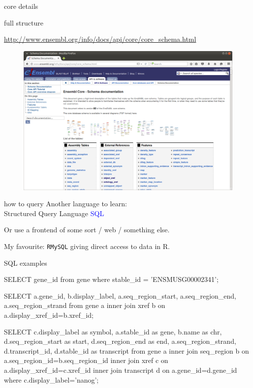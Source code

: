 \documentclass[pdf]{beamer}
\begin{document}
\begin{frame}{core details}
\begin{figure}[ht]
  \end{figure}
\end{frame}

\begin{frame}{full structure}
  
  \tiny \url{http://www.ensembl.org/info/docs/api/core/core_schema.html}
  \begin{figure}[ht]
    \includegraphics[width=\textwidth]{images/ensembl_core_web}
  \end{figure}
\end{frame}

\begin{frame}{how to query}
  Another language to learn:\\
  Structured Query Language \textcolor{blue}{SQL}

  \pause
  Or use a frontend of some sort / web / something else.

  \pause
  My favourite: \texttt{RMySQL} giving direct access to data in R.
\end{frame}

\begin{frame}[fragile]{SQL examples}
  \begin{sqlcode}
SELECT gene_id from gene where stable_id = 'ENSMUSG00002341';

SELECT a.gene_id, b.display_label, a.seq_region_start, 
       a.seq_region_end, a.seq_region_strand
       from gene a
       inner join xref b on a.display_xref_id=b.xref_id;

SELECT c.display_label as symbol, a.stable_id as gene, 
       b.name as chr, d.seq_region_start as start, 
       d.seq_region_end as end, a.seq_region_strand,
       d.transcript_id, d.stable_id as transcript 
       from gene a 
       inner join seq_region b on a.seq_region_id=b.seq_region_id
       inner join xref c on a.display_xref_id=c.xref_id
       inner join transcript d on a.gene_id=d.gene_id
       where c.display_label='nanog';
                   

  \end{sqlcode}
\end{frame}
\end{document}
